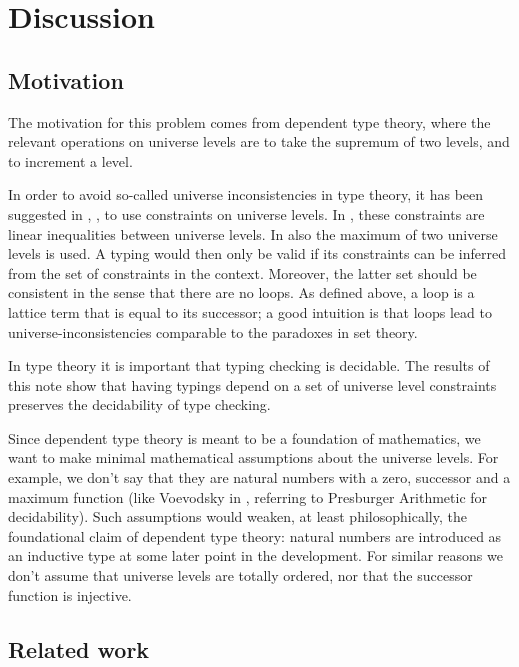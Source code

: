 \documentclass[11pt,a4paper]{article}
\begin{document}
\section{Discussion}

\subsection{Motivation}

The motivation for this problem comes from dependent type theory, 
where the relevant operations on universe levels are to take the
supremum of two levels, and to increment a level.

In order to avoid so-called universe inconsistencies in type theory, 
it has been suggested in \cite{Huet87}, \cite{HarperP91}, \cite{VV}
to use constraints on universe levels.
In \cite{Huet87}, \cite{HarperP91} these constraints
are linear inequalities between universe levels.
In \cite{VV} also the maximum of two universe levels is used.
A typing would then
only be valid if its constraints can be inferred from the set
of constraints in the context. 
Moreover, the latter set should
be consistent in the sense that there are no loops. 
As defined above, a loop is a lattice term that is equal to its successor; 
a good intuition is that loops lead to universe-inconsistencies 
comparable to the paradoxes in set theory.

In type theory it is important that typing checking is decidable.
The results of this note show that having typings depend
on a set of universe level constraints preserves the decidability
of type checking.

Since dependent type theory is meant to be a foundation of mathematics,
we want to make minimal mathematical assumptions about the universe levels.
For example, we don't say that they are natural numbers
with a zero, successor and a maximum function (like Voevodsky in \cite{VV},
referring to Presburger Arithmetic for decidability).
Such assumptions would weaken, at least philosophically,
the foundational claim of dependent type theory:
natural numbers are introduced as an inductive type
at some later point in the development. For similar reasons
we don't assume that universe levels are totally ordered,
nor that the successor function is injective.


\subsection{Related work}
\end{document}
